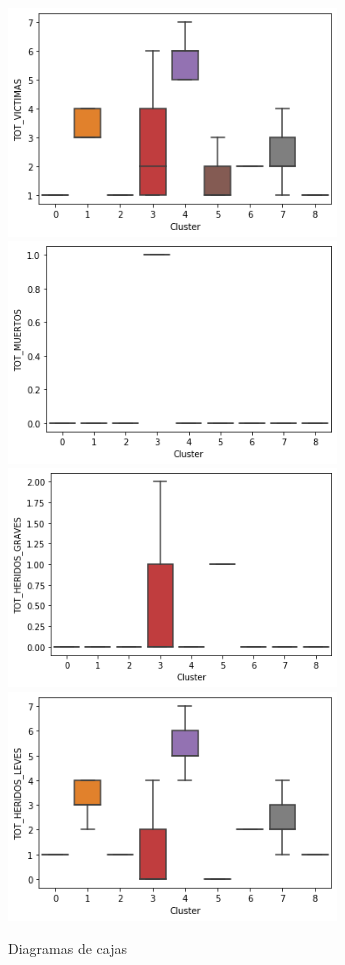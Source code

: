\documentclass[a4]{article}
\begin{document}
\begin{figure}[H]
  \centering
  \caption{Diagramas de cajas}
  \includegraphics[width=87mm]{imagenes/c2_kmeans_vic}
  \includegraphics[width=87mm]{imagenes/c2_kmeans_muertos}
    \includegraphics[width=87mm]{imagenes/c2_kmeans_hg}
  \includegraphics[width=87mm]{imagenes/c2_kmeans_hl}

\end{figure}
\end{document}
